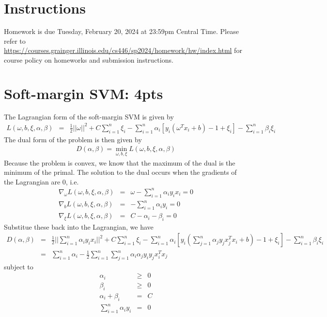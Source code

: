 \documentclass[12pt]{article}
\begin{document}
\singlespacing

\renewcommand{\familydefault}{\rmdefault}


\section{Instructions}

Homework is due Tuesday, February 20, 2024 at 23:59pm Central Time.
Please refer to \url{https://courses.grainger.illinois.edu/cs446/sp2024/homework/hw/index.html} for course policy on homeworks and submission instructions.

\section{Soft-margin SVM: 4pts}
The Lagrangian form of the soft-margin SVM is given by
\begin{eqnarray}
    L(\omega, b, \xi, \alpha, \beta) &=& \frac{1}{2}||\omega||^2 + C\sum_{i=1}^n \xi_i - \sum_{i=1}^n \alpha_i[y_i(\omega^Tx_i + b) - 1 + \xi_i] - \sum_{i=1}^n \beta_i\xi_i \nonumber
\end{eqnarray}
The dual form of the problem is then given by
\begin{eqnarray}
    D(\alpha, \beta) = \min_{\omega, b, \xi} L(\omega, b, \xi, \alpha, \beta) \nonumber
\end{eqnarray}
Because the problem is convex, we know that the maximum of the dual is the minimum of the primal. The solution to the dual occurs when the gradients of the Lagrangian are 0, i.e.
\begin{eqnarray}
    \nabla_{\omega}L(\omega, b, \xi, \alpha, \beta) &=& \omega - \sum_{i=1}^n \alpha_iy_ix_i = 0 \nonumber \\
    \nabla_{b}L(\omega, b, \xi, \alpha, \beta) &=& -\sum_{i=1}^n \alpha_iy_i = 0 \nonumber \\
    \nabla_{\xi}L(\omega, b, \xi, \alpha, \beta) &=& C - \alpha_i - \beta_i = 0 \nonumber
\end{eqnarray}
Substitue these back into the Lagrangian, we have
\begin{eqnarray}
    D(\alpha, \beta) &=& \frac{1}{2}||\sum_{i=1}^n \alpha_iy_ix_i||^2 + C\sum_{i=1}^n \xi_i - \sum_{i=1}^n \alpha_i[y_i(\sum_{j=1}^n \alpha_jy_jx_j^Tx_i + b) - 1 + \xi_i] - \sum_{i=1}^n \beta_i\xi_i \nonumber
    \\ &=& \sum_{i=1}^n \alpha_i - \frac{1}{2}\sum_{i=1}^n\sum_{j=1}^n\alpha_i\alpha_jy_iy_jx_i^Tx_j \nonumber 
\end{eqnarray}
subject to
\begin{eqnarray}
    \alpha_i &\geq& 0 \nonumber \\
    \beta_i &\geq& 0 \nonumber \\
    \alpha_i + \beta_i &=& C \nonumber \\
    \sum_{i=1}^n \alpha_iy_i &=& 0 \nonumber
\end{eqnarray}
\end{document}
